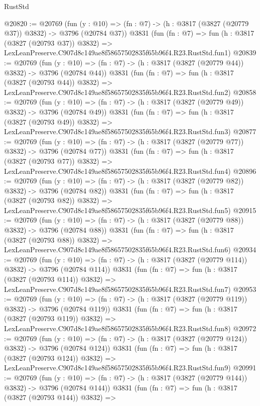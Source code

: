 \begin{lexlean}{RustStd}
\begin{coremodule}
@20820 := @20769
    (fun (y : @10) => (fn : @7) -> (h : @3817 (@3827 (@20779 @37)) @3832) -> @3796 (@20784 @37))
    @3831
    (fun (fn : @7) =>
    fun (h : @3817 (@3827 (@20793 @37)) @3832) =>
    LexLeanPreserve.C907d8c149ae8f58657502835f65b96f4.R23.RustStd.fun1)
@20839 := @20769
    (fun (y : @10) => (fn : @7) -> (h : @3817 (@3827 (@20779 @44)) @3832) -> @3796 (@20784 @44))
    @3831
    (fun (fn : @7) =>
    fun (h : @3817 (@3827 (@20793 @44)) @3832) =>
    LexLeanPreserve.C907d8c149ae8f58657502835f65b96f4.R23.RustStd.fun2)
@20858 := @20769
    (fun (y : @10) => (fn : @7) -> (h : @3817 (@3827 (@20779 @49)) @3832) -> @3796 (@20784 @49))
    @3831
    (fun (fn : @7) =>
    fun (h : @3817 (@3827 (@20793 @49)) @3832) =>
    LexLeanPreserve.C907d8c149ae8f58657502835f65b96f4.R23.RustStd.fun3)
@20877 := @20769
    (fun (y : @10) => (fn : @7) -> (h : @3817 (@3827 (@20779 @77)) @3832) -> @3796 (@20784 @77))
    @3831
    (fun (fn : @7) =>
    fun (h : @3817 (@3827 (@20793 @77)) @3832) =>
    LexLeanPreserve.C907d8c149ae8f58657502835f65b96f4.R23.RustStd.fun4)
@20896 := @20769
    (fun (y : @10) => (fn : @7) -> (h : @3817 (@3827 (@20779 @82)) @3832) -> @3796 (@20784 @82))
    @3831
    (fun (fn : @7) =>
    fun (h : @3817 (@3827 (@20793 @82)) @3832) =>
    LexLeanPreserve.C907d8c149ae8f58657502835f65b96f4.R23.RustStd.fun5)
@20915 := @20769
    (fun (y : @10) => (fn : @7) -> (h : @3817 (@3827 (@20779 @88)) @3832) -> @3796 (@20784 @88))
    @3831
    (fun (fn : @7) =>
    fun (h : @3817 (@3827 (@20793 @88)) @3832) =>
    LexLeanPreserve.C907d8c149ae8f58657502835f65b96f4.R23.RustStd.fun6)
@20934 := @20769
    (fun (y : @10) => (fn : @7) -> (h : @3817 (@3827 (@20779 @114)) @3832) -> @3796 (@20784 @114))
    @3831
    (fun (fn : @7) =>
    fun (h : @3817 (@3827 (@20793 @114)) @3832) =>
    LexLeanPreserve.C907d8c149ae8f58657502835f65b96f4.R23.RustStd.fun7)
@20953 := @20769
    (fun (y : @10) => (fn : @7) -> (h : @3817 (@3827 (@20779 @119)) @3832) -> @3796 (@20784 @119))
    @3831
    (fun (fn : @7) =>
    fun (h : @3817 (@3827 (@20793 @119)) @3832) =>
    LexLeanPreserve.C907d8c149ae8f58657502835f65b96f4.R23.RustStd.fun8)
@20972 := @20769
    (fun (y : @10) => (fn : @7) -> (h : @3817 (@3827 (@20779 @124)) @3832) -> @3796 (@20784 @124))
    @3831
    (fun (fn : @7) =>
    fun (h : @3817 (@3827 (@20793 @124)) @3832) =>
    LexLeanPreserve.C907d8c149ae8f58657502835f65b96f4.R23.RustStd.fun9)
@20991 := @20769
    (fun (y : @10) => (fn : @7) -> (h : @3817 (@3827 (@20779 @144)) @3832) -> @3796 (@20784 @144))
    @3831
    (fun (fn : @7) =>
    fun (h : @3817 (@3827 (@20793 @144)) @3832) =>

\end{coremodule}
\end{lexlean}
